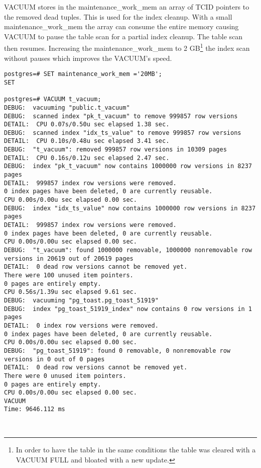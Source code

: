 VACUUM stores in the maintenance\_work\_mem an array of TCID pointers to the removed dead tuples. This 
is used for the index cleanup. With a small maintenance\_work\_mem the array can consume the entire 
memory causing VACUUM to pause the table scan for a partial index cleanup. The table scan then resumes. 
Increasing the maintenance\_work\_mem to 2 GB\footnote{In order to have the table in the same conditions the 
table was cleared with a VACUUM FULL and bloated with a new update.} the index scan without pauses 
which improves the VACUUM's speed.\newline

\begin{lstlisting}[style=pgsql]
postgres=# SET maintenance_work_mem ='20MB';
SET

postgres=# VACUUM t_vacuum;
DEBUG:  vacuuming "public.t_vacuum"
DEBUG:  scanned index "pk_t_vacuum" to remove 999857 row versions
DETAIL:  CPU 0.07s/0.50u sec elapsed 1.38 sec.
DEBUG:  scanned index "idx_ts_value" to remove 999857 row versions
DETAIL:  CPU 0.10s/0.48u sec elapsed 3.41 sec.
DEBUG:  "t_vacuum": removed 999857 row versions in 10309 pages
DETAIL:  CPU 0.16s/0.12u sec elapsed 2.47 sec.
DEBUG:  index "pk_t_vacuum" now contains 1000000 row versions in 8237 pages
DETAIL:  999857 index row versions were removed.
0 index pages have been deleted, 0 are currently reusable.
CPU 0.00s/0.00u sec elapsed 0.00 sec.
DEBUG:  index "idx_ts_value" now contains 1000000 row versions in 8237 pages
DETAIL:  999857 index row versions were removed.
0 index pages have been deleted, 0 are currently reusable.
CPU 0.00s/0.00u sec elapsed 0.00 sec.
DEBUG:  "t_vacuum": found 1000000 removable, 1000000 nonremovable row versions in 20619 out of 20619 pages
DETAIL:  0 dead row versions cannot be removed yet.
There were 100 unused item pointers.
0 pages are entirely empty.
CPU 0.56s/1.39u sec elapsed 9.61 sec.
DEBUG:  vacuuming "pg_toast.pg_toast_51919"
DEBUG:  index "pg_toast_51919_index" now contains 0 row versions in 1 pages
DETAIL:  0 index row versions were removed.
0 index pages have been deleted, 0 are currently reusable.
CPU 0.00s/0.00u sec elapsed 0.00 sec.
DEBUG:  "pg_toast_51919": found 0 removable, 0 nonremovable row versions in 0 out of 0 pages
DETAIL:  0 dead row versions cannot be removed yet.
There were 0 unused item pointers.
0 pages are entirely empty.
CPU 0.00s/0.00u sec elapsed 0.00 sec.
VACUUM
Time: 9646.112 ms



\end{lstlisting}

